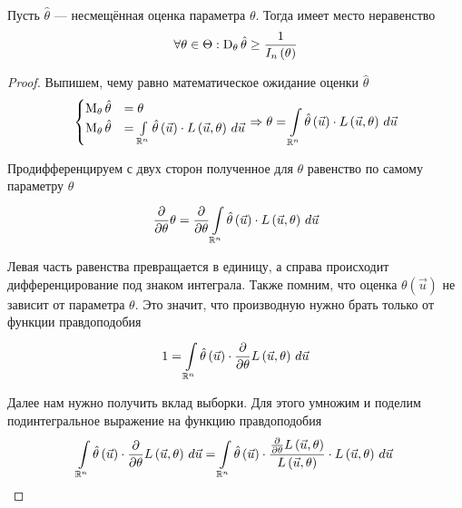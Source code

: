 \begin{theorem}
    Пусть $\hat{\theta}$ --- несмещённая оценка параметра $\theta$.
    Тогда имеет место неравенство
    $$\forall\theta\in\Theta:
        \dispersionof{\theta}{\hat{\theta}}
        \ge\frac{1}{I_n\left(\theta\right)}$$
\end{theorem}
\begin{proof}
    Выпишем, чему равно математическое ожидание оценки $\hat{\theta}$
    $$\begin{cases}
        \meanof{\theta}{\hat{\theta}}
            &=\theta\\
        \meanof{\theta}{\hat{\theta}}
            &=\integral{\mathbb{R}^n}{}{\vec{u}}{
                \hat{\theta}\left( \vec{u} \right)
                    \cdot L\left( \vec{u},\theta \right)}
        \end{cases}
        \Rightarrow
        \theta=\integral{\mathbb{R}^n}{}{\vec{u}}{
                \hat{\theta}\left( \vec{u} \right)
                    \cdot L\left( \vec{u},\theta \right)}$$

    Продифференцируем с двух сторон полученное для $\theta$ равенство
    по самому параметру $\theta$
    $$\frac{\partial}{\partial \theta}\theta
        = \frac{\partial}{\partial \theta}\integral{\mathbb{R}^n}{}{\vec{u}}{
                \hat{\theta}\left( \vec{u} \right)
                    \cdot L\left( \vec{u},\theta \right)}$$

    Левая часть равенства превращается в единицу,
    а справа происходит дифференцирование под знаком интеграла.
    Также помним, что оценка $\theta\left( \vec{u} \right)$
    не зависит от параметра $\theta$.
    Это значит, что производную нужно брать только от функции правдоподобия
    $$1 = \integral{\mathbb{R}^n}{}{\vec{u}}{\hat{\theta}\left( \vec{u} \right)
        \cdot \frac{\partial}{\partial \theta}L\left( \vec{u},\theta \right)}$$

    Далее нам нужно получить вклад выборки.
    Для этого умножим и поделим подинтегральное выражение
    на функцию правдоподобия
    $$\integral{\mathbb{R}^n}{}{\vec{u}}{\hat{\theta}\left( \vec{u} \right)
        \cdot \frac{\partial}{\partial \theta}L\left( \vec{u},\theta \right)}
    = \integral{\mathbb{R}^n}{}{\vec{u}}{\hat{\theta}\left( \vec{u} \right)
        \cdot \frac{
            \frac{\partial}{\partial \theta}L\left( \vec{u},\theta \right)}
            {L\left( \vec{u},\theta \right)}
                \cdot L\left( \vec{u},\theta \right)}$$


\end{proof}
